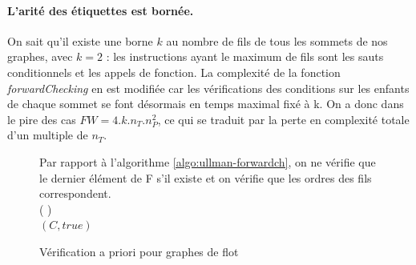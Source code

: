 \paragraph{L'arité des étiquettes est bornée.}
On sait qu'il existe une borne $k$ au nombre de fils de tous les sommets de nos graphes, avec $k=2$ : les instructions ayant le maximum de fils sont les sauts conditionnels et les appels de fonction.
La complexité de la fonction \emph{forwardChecking} en est modifiée car les vérifications des conditions sur les enfants de chaque sommet se font désormais en temps maximal fixé à k. On a donc dans le pire des cas $FW=4.k.n_T.n_P^2$, ce qui se traduit par la perte en complexité totale d'un multiple de $n_T$.

\begin{figure}[h]
\begin{algorithm}[H] %
\caption{Vérification a priori pour graphes de flot}
\SetAlgoLined
Par rapport à l'algorithme \ref{algo:ullman-forwardch}, on ne vérifie que le dernier élément de F s'il existe et on vérifie que les ordres des fils correspondent.\\
\Fn(
){}{
\\
\Return $(C, true)$
}
\label{algo:ullman-forwardch-site}
\end{algorithm}
\end{figure}

